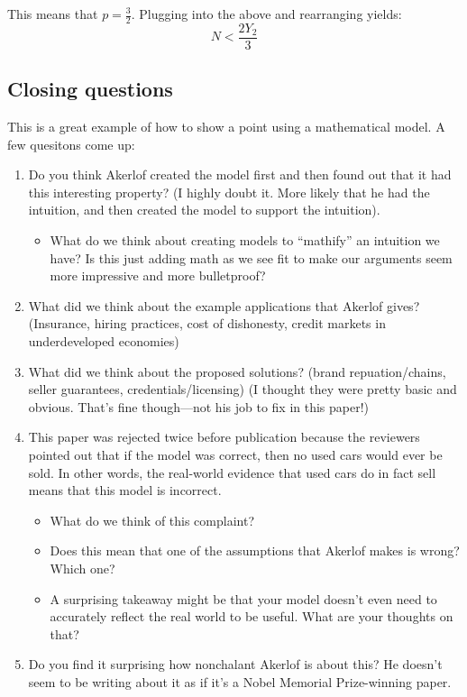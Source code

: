 \documentclass[11pt]{article}
\begin{document}
This means that $p=\frac{3}{2}$. Plugging into the above and rearranging yields:
\begin{equation}
    N < \frac{2Y_2}{3}
\end{equation}


\subsection{Closing questions}

This is a great example of how to show a point using a mathematical model. A few quesitons come up:
\begin{enumerate}
    \item Do you think Akerlof created the model first and then found out that it had this interesting property? (I highly doubt it. More likely that he had the intuition, and then created the model to support the intuition).
    \begin{itemize}
        \item What do we think about creating models to ``mathify'' an intuition we have? Is this just adding math as we see fit to make our arguments seem more impressive and more bulletproof? 
    \end{itemize}
    \item What did we think about the example applications that Akerlof gives? (Insurance, hiring practices, cost of dishonesty, credit markets in underdeveloped economies)
    \item What did we think about the proposed solutions? (brand repuation/chains, seller guarantees, credentials/licensing) (I thought they were pretty basic and obvious. That's fine though---not his job to fix in this paper!)
    \item This paper was rejected twice before publication because the reviewers pointed out that if the model was correct, then no used cars would ever be sold. In other words, the real-world evidence that used cars do in fact sell means that this model is incorrect.
    \begin{itemize}
        \item What do we think of this complaint?
        \item Does this mean that one of the assumptions that Akerlof makes is wrong? Which one?
        \item A surprising takeaway might be that your model doesn't even need to accurately reflect the real world to be useful. What are your thoughts on that?
    \end{itemize}
    \item Do you find it surprising how nonchalant Akerlof is about this? He doesn't seem to be writing about it as if it's a Nobel Memorial Prize-winning paper.
\end{enumerate}
\end{document}
